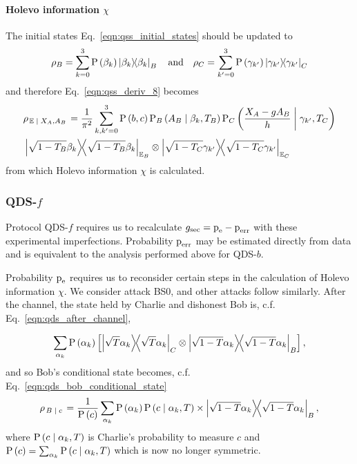 \paragraph{Holevo information $\chi$}
The initial states Eq.~\ref{eqn:qss_initial_states} should be updated to
\begin{equation}
\rho_B = \sum_{k=0}^3 \text{P}\left(\beta_k\right) \dyad{\beta_k}_B \qq{and} \rho_C = \sum_{k^\prime=0}^3 \text{P}\left(\gamma_{k^\prime}\right) \dyad{\gamma_{k^\prime}}_C
\end{equation}
and therefore Eq.~\ref{eqn:qss_deriv_8} becomes
\begin{align}
&\rho_{\left.\mathbb{E} \given X_A, A_B\right.} = \frac{1}{\pi^2}\sum_{k, k^\prime=0}^3 \text{P}\left(b, c\right) \text{P}_B\left(A_B \given \beta_k, T_B\right) \text{P}_C\left(\frac{X_A - g A_B}{h} \given \gamma_{k^\prime}, T_C\right) \notag \\
&\dyad{\sqrt{1-T_B}\beta_k}_{\mathbb{E}_B} \otimes \dyad{\sqrt{1-T_C} \gamma_{k^\prime}}_{\mathbb{E}_C}
\end{align}
from which Holevo information $\chi$ is calculated.

\subsubsection{QDS-$f$}
Protocol QDS-$f$ requires us to recalculate $g_{\text{sec}} = \text{p}_{\text{e}} - \text{p}_{\text{err}}$ with these experimental imperfections. Probability $\text{p}_{\text{err}}$ may be estimated directly from data and is equivalent to the analysis performed above for QDS-$b$.

Probability $\text{p}_{\text{e}}$ requires us to reconsider certain steps in the calculation of Holevo information $\chi$. We consider attack BS$0$, and other attacks follow similarly. After the channel, the state held by Charlie and dishonest Bob is, c.f. Eq.~\ref{eqn:qds_after_channel},

\begin{equation}
\sum_{\alpha_k} \text{P}\left(\alpha_k\right)  \left[ \dyad{\sqrt{T}\alpha_k}_C \otimes \dyad{\sqrt{1-T}\alpha_k}_B\right],
\end{equation}
and so Bob's conditional state becomes, c.f. Eq.~\ref{eqn:qds_bob_conditional_state}
\begin{equation}
\rho_{\left.B \given c\right.} = \frac{1}{\text{P}\left(c\right)} \sum_{\alpha_k} \text{P}\left(\alpha_k\right) \text{P}\left(c \given \alpha_k, T\right) \times \dyad{\sqrt{1-T}\alpha_k}_B,
\end{equation}
where $\text{P}\left(c \; \middle| \; \alpha_k, T\right)$ is Charlie's probability to measure $c$ and $\text{P}\left(c\right) = \sum_{\alpha_k}\text{P}\left(c \; \middle| \; \alpha_k, T\right)$ which is now no longer symmetric.

